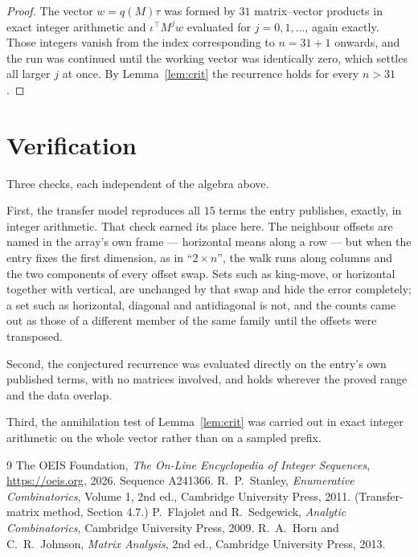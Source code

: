 \documentclass[11pt,a4paper]{article}
\theoremstyle{plain}
\theoremstyle{definition}
\begin{document}
\begin{proof}
The vector $w=q(M)\tau$ was formed by $31$ matrix--vector products in exact integer
arithmetic and $\iota^{\!\top}M^{j}w$ evaluated for $j=0,1,\dots$, again exactly. Those
integers vanish from the index corresponding to $n=31+1$ onwards, and the run was
continued until the working vector was identically zero, which settles all larger $j$ at once.
By Lemma~\ref{lem:crit} the recurrence holds for every $n>31$.
\end{proof}

\section{Verification}

Three checks, each independent of the algebra above.

First, the transfer model reproduces all $15$ terms the entry publishes, exactly, in
integer arithmetic. That check earned its place here. The neighbour offsets are named in the
array's own frame --- horizontal means along a row --- but when the entry fixes the first
dimension, as in ``$2\times n$'', the walk runs along columns and the two components of every
offset swap. Sets such as king-move, or horizontal together with vertical, are unchanged by
that swap and hide the error completely; a set such as horizontal, diagonal and antidiagonal
is not, and the counts came out as those of a different member of the same family until the
offsets were transposed.

Second, the conjectured recurrence was evaluated directly on the entry's own published terms,
with no matrices involved, and holds wherever the proved range and the data overlap.

Third, the annihilation test of Lemma~\ref{lem:crit} was carried out in exact integer
arithmetic on the whole vector rather than on a sampled prefix.

\begin{thebibliography}{9}
 The OEIS Foundation, \emph{The On-Line Encyclopedia of Integer
Sequences}, \url{https://oeis.org}, 2026. Sequence A241366.
 R.~P.~Stanley, \emph{Enumerative Combinatorics}, Volume 1, 2nd ed.,
Cambridge University Press, 2011. (Transfer-matrix method, Section 4.7.)
 P.~Flajolet and R.~Sedgewick, \emph{Analytic Combinatorics}, Cambridge
University Press, 2009.
 R.~A.~Horn and C.~R.~Johnson, \emph{Matrix Analysis}, 2nd ed., Cambridge
University Press, 2013.
\end{thebibliography}
\end{document}
